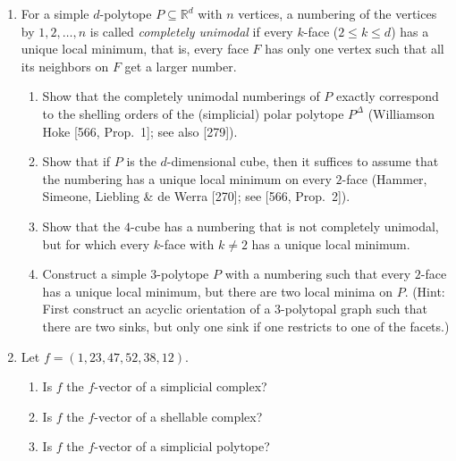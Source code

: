 \documentclass{article}
\begin{document}
\begin{enumerate}
\item For a simple $d$-polytope $P\subseteq \mathbb{R}^d$ with $n$ vertices, a numbering of the vertices by $1,2,\dots,n$ is called \emph{completely unimodal} if every $k$-face ($2\le k\le d$) has a unique local minimum, that is, every face $F$ has only one vertex such that all its neighbors on $F$ get a larger number.
\begin{enumerate}[label=(\roman*)]
\item Show that the completely unimodal numberings of $P$ exactly correspond to the shelling orders of the (simplicial) polar polytope $P^\Delta$ (Williamson Hoke [566, Prop.~1]; see also [279]).
\item Show that if $P$ is the $d$-dimensional cube, then it suffices to assume that the numbering has a unique local minimum on every $2$-face (Hammer, Simeone, Liebling \& de Werra [270]; see [566, Prop.~2]).
\item Show that the $4$-cube has a numbering that is not completely unimodal, but for which every $k$-face with $k\ne 2$ has a unique local minimum.
\item Construct a simple $3$-polytope $P$ with a numbering such that every $2$-face has a unique local minimum, but there are two local minima on $P$. (Hint: First construct an acyclic orientation of a $3$-polytopal graph such that there are two sinks, but only one sink if one restricts to one of the facets.)
\end{enumerate}

\item Let $f=(1,23,47,52,38,12)$.
\begin{enumerate}[label=(\roman*)]
\item Is $f$ the $f$-vector of a simplicial complex?
\item Is $f$ the $f$-vector of a shellable complex?
\item Is $f$ the $f$-vector of a simplicial polytope?
\end{enumerate}


\end{enumerate}
\end{document}

